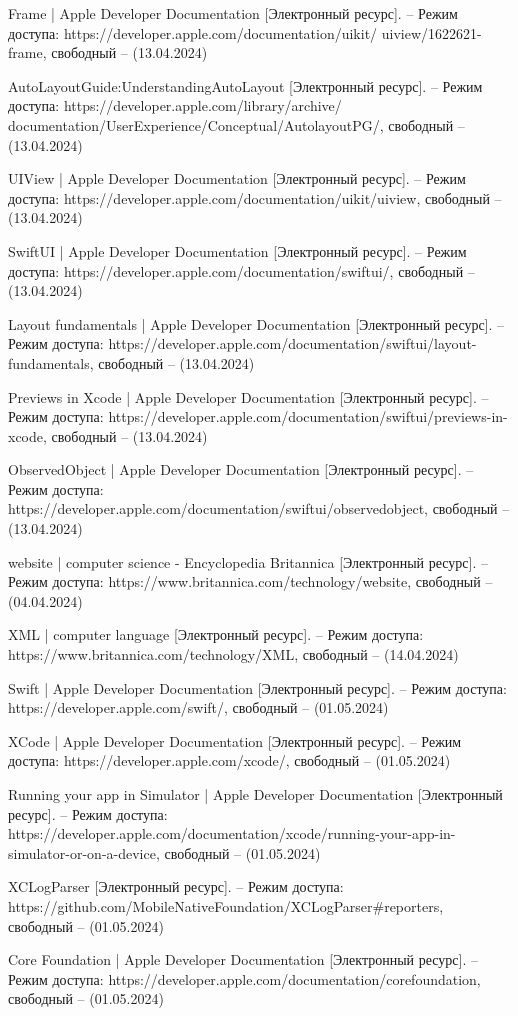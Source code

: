 \begin{thebibliography}{}
	Frame | Apple Developer Documentation [Электронный ресурс]. – Режим доступа: https://developer.apple.com/documentation/uikit/ uiview/1622621-frame,
	свободный – (13.04.2024)
	
	AutoLayoutGuide:UnderstandingAutoLayout [Электронный ресурс]. – Режим доступа: https://developer.apple.com/library/archive/ documentation/UserExperience/Conceptual/AutolayoutPG/,
	свободный – (13.04.2024)
	
	UIView | Apple Developer Documentation [Электронный ресурс]. – Режим доступа: https://developer.apple.com/documentation/uikit/uiview,
	свободный – (13.04.2024)
	
	SwiftUI | Apple Developer Documentation [Электронный ресурс]. – Режим доступа: https://developer.apple.com/documentation/swiftui/, 
	свободный – (13.04.2024)
	
	Layout fundamentals | Apple Developer Documentation [Электронный ресурс]. – Режим доступа: https://developer.apple.com/documentation/swiftui/layout-fundamentals, 
	свободный – (13.04.2024)
	
	Previews in Xcode | Apple Developer Documentation [Электронный ресурс]. – Режим доступа: https://developer.apple.com/documentation/swiftui/previews-in-xcode,
	свободный – (13.04.2024)
	
	ObservedObject | Apple Developer Documentation [Электронный ресурс]. – Режим доступа: https://developer.apple.com/documentation/swiftui/observedobject,
	свободный – (13.04.2024)
	
	website | computer science - Encyclopedia Britannica [Электронный ресурс]. – Режим доступа: https://www.britannica.com/technology/website,
	свободный – (04.04.2024)
	
	XML | computer language [Электронный ресурс]. – Режим доступа: https://www.britannica.com/technology/XML,
	свободный – (14.04.2024)
	
	Swift | Apple Developer Documentation  [Электронный ресурс]. – Режим доступа: https://developer.apple.com/swift/,
	свободный – (01.05.2024)
	
	XCode | Apple Developer Documentation  [Электронный ресурс]. – Режим доступа: https://developer.apple.com/xcode/,
	свободный – (01.05.2024)
	
	Running your app in Simulator | Apple Developer Documentation  [Электронный ресурс]. – Режим доступа: https://developer.apple.com/documentation/xcode/running-your-app-in-simulator-or-on-a-device,
	свободный – (01.05.2024)
	
	XCLogParser [Электронный ресурс]. – Режим доступа: https://github.com/MobileNativeFoundation/XCLogParser#reporters,
	свободный – (01.05.2024)
	
	Core Foundation | Apple Developer Documentation [Электронный ресурс]. – Режим доступа: https://developer.apple.com/documentation/corefoundation,
	свободный – (01.05.2024)
	
	

\end{thebibliography}
\endgroup

\pagebreak
